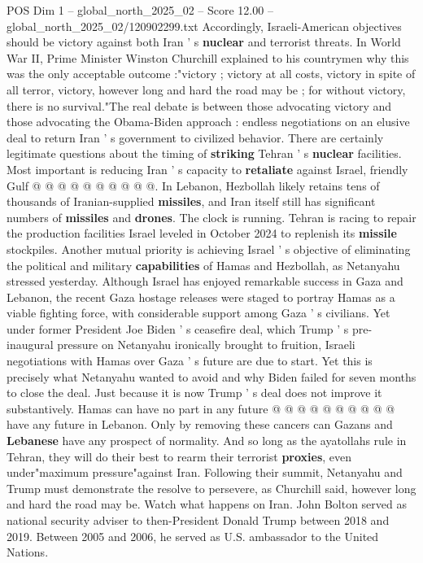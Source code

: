 \begin{textsample}{POS Dim 1 – global\_north\_2025\_02 – Score 12.00 – global\_north\_2025\_02/120902299.txt}
Accordingly, Israeli-American objectives should be victory against both Iran ' s \textbf{nuclear} and terrorist threats.
In World War II, Prime Minister Winston Churchill explained to his countrymen why this was the only acceptable outcome :"victory ; victory at all costs, victory in spite of all terror, victory, however long and hard the road may be ; for without victory, there is no survival."The real debate is between those advocating victory and those advocating the Obama-Biden approach : endless negotiations on an elusive deal to return Iran ' s government to civilized behavior.
There are certainly legitimate questions about the timing of \textbf{striking} Tehran ' s \textbf{nuclear} facilities.
Most important is reducing Iran ' s capacity to \textbf{retaliate} against Israel, friendly Gulf @ @ @ @ @ @ @ @ @ @.
In Lebanon, Hezbollah likely retains tens of thousands of Iranian-supplied \textbf{missiles}, and Iran itself still has significant numbers of \textbf{missiles} and \textbf{drones}.
The clock is running.
Tehran is racing to repair the production facilities Israel leveled in October 2024 to replenish its \textbf{missile} stockpiles.
Another mutual priority is achieving Israel ' s objective of eliminating the political and military \textbf{capabilities} of Hamas and Hezbollah, as Netanyahu stressed yesterday.
Although Israel has enjoyed remarkable success in Gaza and Lebanon, the recent Gaza hostage releases were staged to portray Hamas as a viable fighting force, with considerable support among Gaza ' s civilians.
Yet under former President Joe Biden ' s ceasefire deal, which Trump ' s pre-inaugural pressure on Netanyahu ironically brought to fruition, Israeli negotiations with Hamas over Gaza ' s future are due to start.
Yet this is precisely what Netanyahu wanted to avoid and why Biden failed for seven months to close the deal.
Just because it is now Trump ' s deal does not improve it substantively.
Hamas can have no part in any future @ @ @ @ @ @ @ @ @ @ have any future in Lebanon.
Only by removing these cancers can Gazans and \textbf{Lebanese} have any prospect of normality.
And so long as the ayatollahs rule in Tehran, they will do their best to rearm their terrorist \textbf{proxies}, even under"maximum pressure"against Iran.
Following their summit, Netanyahu and Trump must demonstrate the resolve to persevere, as Churchill said, however long and hard the road may be.
Watch what happens on Iran.
John Bolton served as national security adviser to then-President Donald Trump between 2018 and 2019.
Between 2005 and 2006, he served as U.S. ambassador to the United Nations.

\end{textsample}
